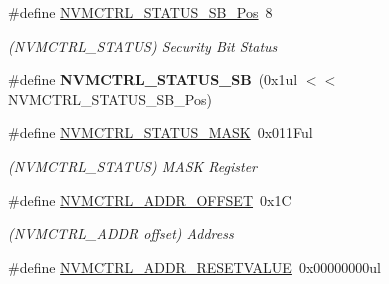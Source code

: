 \begin{DoxyCompactItemize}
\item 
\hypertarget{group___s_a_m_l21___n_v_m_c_t_r_l_gacccc823d51d05b7675cb22b0274f70c3}{}\#define \hyperlink{group___s_a_m_l21___n_v_m_c_t_r_l_gacccc823d51d05b7675cb22b0274f70c3}{N\+V\+M\+C\+T\+R\+L\+\_\+\+S\+T\+A\+T\+U\+S\+\_\+\+S\+B\+\_\+\+Pos}~8\label{group___s_a_m_l21___n_v_m_c_t_r_l_gacccc823d51d05b7675cb22b0274f70c3}

\begin{DoxyCompactList}\small\item\em (N\+V\+M\+C\+T\+R\+L\+\_\+\+S\+T\+A\+T\+U\+S) Security Bit Status \end{DoxyCompactList}\item 
\hypertarget{group___s_a_m_l21___n_v_m_c_t_r_l_gab3f3d247dde4f7d65d04625007681f34}{}\#define {\bfseries N\+V\+M\+C\+T\+R\+L\+\_\+\+S\+T\+A\+T\+U\+S\+\_\+\+S\+B}~(0x1ul $<$$<$ N\+V\+M\+C\+T\+R\+L\+\_\+\+S\+T\+A\+T\+U\+S\+\_\+\+S\+B\+\_\+\+Pos)\label{group___s_a_m_l21___n_v_m_c_t_r_l_gab3f3d247dde4f7d65d04625007681f34}

\item 
\hypertarget{group___s_a_m_l21___n_v_m_c_t_r_l_gacb0fa540b3def00184ee02da753f171e}{}\#define \hyperlink{group___s_a_m_l21___n_v_m_c_t_r_l_gacb0fa540b3def00184ee02da753f171e}{N\+V\+M\+C\+T\+R\+L\+\_\+\+S\+T\+A\+T\+U\+S\+\_\+\+M\+A\+S\+K}~0x011\+Ful\label{group___s_a_m_l21___n_v_m_c_t_r_l_gacb0fa540b3def00184ee02da753f171e}

\begin{DoxyCompactList}\small\item\em (N\+V\+M\+C\+T\+R\+L\+\_\+\+S\+T\+A\+T\+U\+S) M\+A\+S\+K Register \end{DoxyCompactList}\item 
\hypertarget{group___s_a_m_l21___n_v_m_c_t_r_l_ga2540268cdeb3644aa722cb8cce5546c8}{}\#define \hyperlink{group___s_a_m_l21___n_v_m_c_t_r_l_ga2540268cdeb3644aa722cb8cce5546c8}{N\+V\+M\+C\+T\+R\+L\+\_\+\+A\+D\+D\+R\+\_\+\+O\+F\+F\+S\+E\+T}~0x1\+C\label{group___s_a_m_l21___n_v_m_c_t_r_l_ga2540268cdeb3644aa722cb8cce5546c8}

\begin{DoxyCompactList}\small\item\em (N\+V\+M\+C\+T\+R\+L\+\_\+\+A\+D\+D\+R offset) Address \end{DoxyCompactList}\item 
\hypertarget{group___s_a_m_l21___n_v_m_c_t_r_l_ga150652b364483d20d947140a67e2fe25}{}\#define \hyperlink{group___s_a_m_l21___n_v_m_c_t_r_l_ga150652b364483d20d947140a67e2fe25}{N\+V\+M\+C\+T\+R\+L\+\_\+\+A\+D\+D\+R\+\_\+\+R\+E\+S\+E\+T\+V\+A\+L\+U\+E}~0x00000000ul\label{group___s_a_m_l21___n_v_m_c_t_r_l_ga150652b364483d20d947140a67e2fe25}


\end{DoxyCompactItemize}
